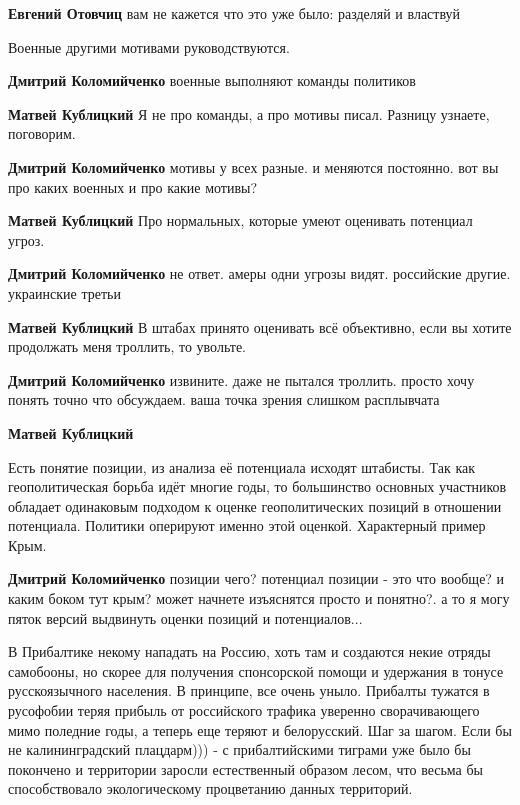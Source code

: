 \begin{itemize}
\begin{itemize}
\textbf{Евгений Отовчиц} вам не кажется что это уже было: разделяй и властвуй

Военные другими мотивами руководствуются.

\textbf{Дмитрий Коломийченко} военные выполняют команды политиков

\textbf{Матвей Кублицкий} Я не про команды, а про мотивы писал. Разницу узнаете, поговорим.

\textbf{Дмитрий Коломийченко} мотивы у всех разные. и меняются постоянно. вот вы про каких военных и про какие мотивы?

\textbf{Матвей Кублицкий} Про нормальных, которые умеют оценивать потенциал угроз.

\textbf{Дмитрий Коломийченко} не ответ. амеры одни угрозы видят. российские другие. украинские третьи

\textbf{Матвей Кублицкий} В штабах принято оценивать всё объективно, если вы хотите продолжать меня троллить, то увольте.

\textbf{Дмитрий Коломийченко} извините. даже не пытался троллить. просто хочу понять точно что обсуждаем. ваша точка зрения слишком расплывчата

\textbf{Матвей Кублицкий} 

Есть понятие позиции, из анализа её потенциала исходят штабисты. Так как
геополитическая борьба идёт многие годы, то большинство основных участников
обладает одинаковым подходом к оценке геополитических позиций в отношении
потенциала. Политики оперируют именно этой оценкой. Характерный пример Крым.


\textbf{Дмитрий Коломийченко} позиции чего? потенциал позиции - это что вообще? и каким боком тут крым? может начнете изъяснятся просто и понятно?. а то я могу пяток версий выдвинуть оценки позиций и потенциалов...

\end{itemize} %


В Прибалтике некому нападать на Россию, хоть там и создаются некие отряды
самобооны, но скорее для получения спонсорской помощи и удержания в тонусе
русскоязычного населения. В принципе, все очень уныло. Прибалты тужатся в
русофобии теряя прибыль от российского трафика уверенно сворачивающего мимо
поледние годы, а теперь еще теряют и белорусский. Шаг за шагом. Если бы не
калининградский плацдарм))) - с прибалтийскими тиграми уже было бы покончено и
территории заросли естественный образом лесом, что весьма бы способствовало
экологическому процветанию данных территорий.


\end{itemize}
